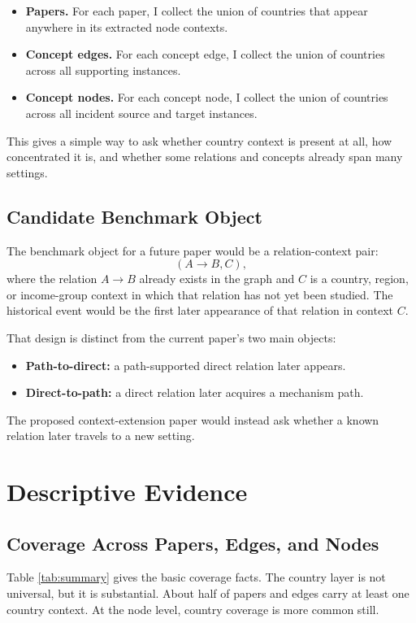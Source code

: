 \documentclass[11pt]{article}
\begin{document}
\begin{itemize}
    \item \textbf{Papers.} For each paper, I collect the union of countries that appear anywhere in its extracted node contexts.
    \item \textbf{Concept edges.} For each concept edge, I collect the union of countries across all supporting instances.
    \item \textbf{Concept nodes.} For each concept node, I collect the union of countries across all incident source and target instances.
\end{itemize}

This gives a simple way to ask whether country context is present at all, how concentrated it is, and whether some relations and concepts already span many settings.

\subsection{Candidate Benchmark Object}
The benchmark object for a future paper would be a relation-context pair:
\[
(A \rightarrow B, C),
\]
where the relation \(A \rightarrow B\) already exists in the graph and \(C\) is a country, region, or income-group context in which that relation has not yet been studied. The historical event would be the first later appearance of that relation in context \(C\).

That design is distinct from the current paper's two main objects:
\begin{itemize}
    \item \textbf{Path-to-direct:} a path-supported direct relation later appears.
    \item \textbf{Direct-to-path:} a direct relation later acquires a mechanism path.
\end{itemize}

The proposed context-extension paper would instead ask whether a known relation later travels to a new setting.

\section{Descriptive Evidence}
\subsection{Coverage Across Papers, Edges, and Nodes}
Table \ref{tab:summary} gives the basic coverage facts. The country layer is not universal, but it is substantial. About half of papers and edges carry at least one country context. At the node level, country coverage is more common still.
\end{document}
